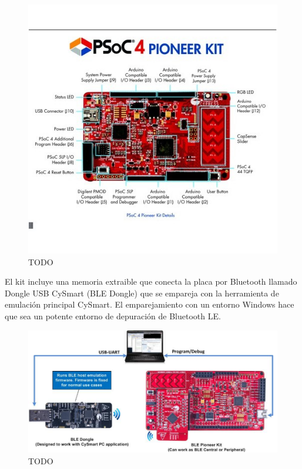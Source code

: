 \begin{figure}[h]%
	\centering
    \includegraphics[scale=0.5]{figures/cypress_placa_desarrollo} %

    \caption[TODO]{TODO}

   \label{figuraCypressGrande}
\end{figure}

El kit incluye una memoria extraible que conecta la placa por Bluetooth llamado Dongle USB CySmart (BLE Dongle) que se empareja con la herramienta de emulación principal CySmart. El emparejamiento con un entorno Windows hace que sea un potente entorno de depuración de Bluetooth LE.

\begin{figure}[h]%
	\centering
    \includegraphics[scale=0.5]{figures/cypress_dongle.png} %

    \caption[TODO]{TODO}

   \label{figuraCypressDongle}
\end{figure}

